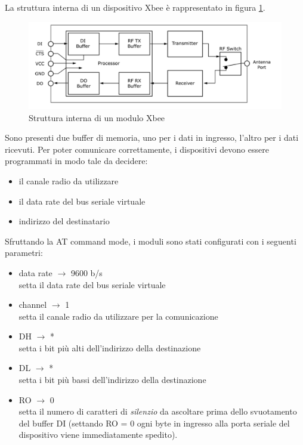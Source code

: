 \documentclass[12pt,a4paper,oneside,openright,italian]{article}
\begin{document}
La struttura interna di un dispositivo Xbee \`e rappresentato in figura \ref{xbee}.
\begin{figure}[!hbp]
  \centering
  \includegraphics[width=390pt]{immagini/xbee_flow.png}
  \caption{Struttura interna di un modulo Xbee}
  \label{xbee}
\end{figure}

Sono presenti due buffer di memoria, uno per i dati in ingresso, l'altro per i dati ricevuti. Per poter comunicare correttamente, i dispositivi devono essere programmati in modo tale da decidere:
\begin{itemize}
\item il canale radio da utilizzare
\item il data rate del bus seriale virtuale
\item indirizzo del destinatario
\end{itemize}

Sfruttando la AT command mode, i moduli sono stati configurati con i seguenti parametri:

\begin{itemize}
\item data rate $\rightarrow$ 9600 b/s \\
  setta il data rate del bus seriale virtuale
\item channel $\rightarrow$ 1 \\
  setta il canale radio da utilizzare per la comunicazione
\item DH $\rightarrow$ * \\
  setta i bit pi\`u alti dell'indirizzo della destinazione
\item DL $\rightarrow$ * \\
  setta i bit pi\`u bassi dell'indirizzo della destinazione
\item RO $\rightarrow$ 0 \\
  setta il numero di caratteri di \emph{silenzio} da ascoltare prima dello svuotamento del buffer DI (settando RO = 0 ogni byte in ingresso alla porta seriale del dispositivo viene immediatamente spedito).
\end{itemize}
\end{document}
